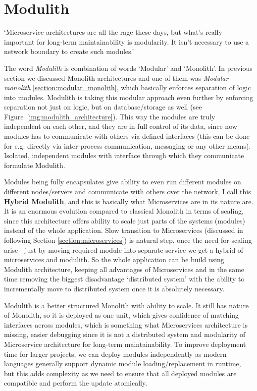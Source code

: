 \section{Modulith}
\label{section:modulith}
`Microservice architectures are all the rage these days, but what's really important for long-term maintainability is modularity. It isn't necessary to use a network boundary to create such modules.' \cite{HOW_TO_BUILD_MODULAR_MONOLITH_CONFERENCE_INTRO}

The word \textit{Modulith} is combination of words `Modular' and `Monolith'. In previous section we discussed Monolith architectures and one of them was \textit{Modular monolith} \ref{section:modular_monolith}, which basically enforces separation of logic into modules. Modulith is taking this modular approach even further by enforcing separation not just on logic, but on database/storage as well (see Figure~\ref{img:modulith_architecture}). This way the modules are truly independent on each other, and they are in full control of its data, since now modules has to communicate with others via defined interfaces (this can be done for e.g. directly via inter-process communication, messaging or any other means). Isolated, independent modules with interface through which they communicate formulate Modulith.

Modules being fully encapsulates give ability to even run different modules on different nodes/servers and communicate with others over the network, I call this \textbf{Hybrid Modulith}, and this is basically what Microservices are in its nature are. It is an enormous evolution compared to classical Monolith in terms of scaling, since this architecture offers ability to scale just parts of the systems (modules) instead of the whole application. Slow transition to Microservices (discussed in following Section \ref{section:microservices}) is natural step, once the need for scaling arise - just by moving required module into separate service we get a hybrid of microservices and modulith. So the whole application can be build using Modulith architecture, keeping all advantages of Microservices and in the same time removing the biggest disadvantage `distributed system' with the ability to incrementally move to distributed system once it is absolutely necessary.

Modulith is a better structured Monolith with ability to scale. It still has nature of Monolith, so it is deployed as one unit, which gives confidence of matching interfaces across modules, which is something what Microservices architecture is missing, easier debugging since it is not a distributed system and modularity of Microservice architecture for long-term maintainability. To improve deployment time for larger projects, we can deploy modules independently as modern languages generally support dynamic module loading/replacement in runtime, but this adds complexity as we need to ensure that all deployed modules are compatible and perform the update atomically. 

